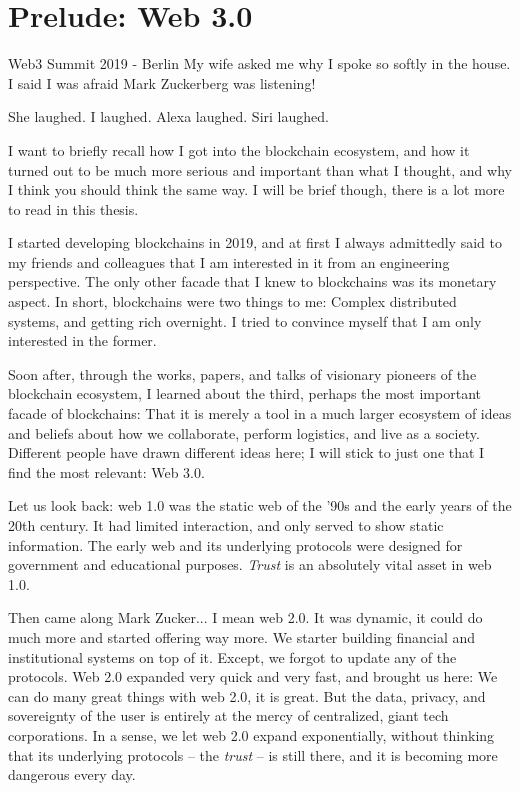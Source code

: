 \chapter*{Prelude: Web 3.0}

\begin{chapquote}{Web3 Summit 2019 - Berlin}
	My wife asked me why I spoke so softly in the house. I said I was afraid Mark Zuckerberg was
	listening!

	She laughed. I laughed. Alexa laughed. Siri laughed.
\end{chapquote}

I want to briefly recall how I got into the blockchain ecosystem, and how it turned out to be much
more serious and important than what I thought, and why I think you should think the same way. I
will be brief though, there is a lot more to read in this thesis.

I started developing blockchains in 2019, and at first I always admittedly said to my friends and
colleagues that I am interested in it from an engineering perspective. The only other facade that I
knew to blockchains was its monetary aspect. In short, blockchains were two things to me: Complex
distributed systems, and getting rich overnight. I tried to convince myself that I am only
interested in the former.

Soon after, through the works, papers, and talks of visionary pioneers of the blockchain ecosystem,
I learned about the third, perhaps the most important facade of blockchains: That it is merely a
tool in a much larger ecosystem of ideas and beliefs about how we collaborate, perform logistics,
and live as a society. Different people have drawn different ideas here; I will stick to just one
that I find the most relevant: Web 3.0.

Let us look back: web 1.0 was the static web of the '90s and the early years of the 20th century. It
had limited interaction, and only served to show static information. The early web and its
underlying protocols were designed for government and educational purposes. \textit{Trust} is an
absolutely vital asset in web 1.0.

Then came along Mark Zucker... I mean web 2.0. It was dynamic, it could do much more and started
offering way more. We starter building financial and institutional systems on top of it. Except, we
forgot to update any of the protocols. Web 2.0 expanded very quick and very fast, and brought us
here: We can do many great things with web 2.0, it is great. But the data, privacy, and sovereignty
of the user is entirely at the mercy of centralized, giant tech corporations. In a sense, we let web
2.0 expand exponentially, without thinking that its underlying protocols -- the \textit{trust} -- is
still there, and it is becoming more dangerous every day.

